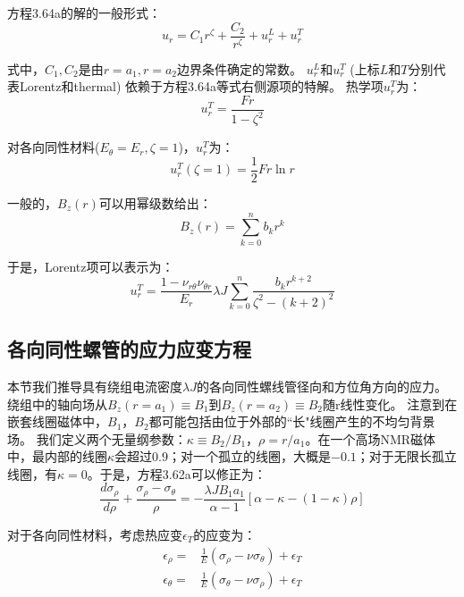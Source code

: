 方程3.64a的解的一般形式：
\begin{equation}
u_r=C_1r^\zeta+\frac{C_2}{r^\zeta}+u_r^L+u_r^T
\end{equation}

式中，$C_1,C_2$是由$r = a_1, r = a_2$边界条件确定的常数。
$u^L_r$和$u^T_r$ (上标$L$和$T$分别代表Lorentz和thermal) 依赖于方程3.64a等式右侧源项的特解。
热学项$u^T_r$为：
\begin{equation}
u_r^T=\frac{Fr}{1-\zeta^2}
\end{equation}

对各向同性材料($E_\theta =E_r,\zeta =1$)，$u_r^T$为：
\begin{equation}
u_r^T(\zeta=1)=\frac{1}{2}Fr \ln r
\end{equation}

一般的，$B_z(r)$可以用幂级数给出：
\begin{equation}
B_z(r)=\sum_{k=0}^{n}b_kr^k
\end{equation}

于是，Lorentz项可以表示为：
\begin{equation}
u_r^T=\frac{1-\nu_{r\theta}\nu_{\theta r}}{E_r}\lambda J\sum_{k=0}^{n}\frac{b_k r^{k+2}}{\zeta^2-(k+2)^2}
\end{equation}

\subsection{各向同性螺管的应力应变方程}
本节我们推导具有绕组电流密度$\lambda J$的各向同性螺线管径向和方位角方向的应力。
绕组中的轴向场从$B_z(r = a_1)\equiv B_1$到$B_z(r = a_2)\equiv B_2$随r线性变化。
注意到在嵌套线圈磁体中，$B_1，B_2$都可能包括由位于外部的``长"线圈产生的不均匀背景场。
我们定义两个无量纲参数：$\kappa\equiv B_2/B_1，\rho = r/a_1$。在一个高场NMR磁体中，最内部的线圈$\kappa$会超过$0.9$；对一个孤立的线圈，大概是$-0.1$；对于无限长孤立线圈，有$\kappa=0$。于是，方程3.62a可以修正为：
\begin{equation}
\frac{d\sigma_{\rho}}{d\rho}+\frac{\sigma_\rho-\sigma_\theta}{\rho}=-\frac{\lambda JB_1a_1}{\alpha-1}[\alpha-\kappa-(1-\kappa)\rho]
\end{equation}

对于各向同性材料，考虑热应变$\epsilon_T$的应变为：
\begin{subequations}
	\begin{align}
\epsilon_\rho=&\frac{1}{E}(\sigma_\rho-\nu\sigma_\theta)+\epsilon_T\\
\epsilon_\theta=&\frac{1}{E}(\sigma_\theta-\nu\sigma_\rho)+\epsilon_T
	\end{align}
\end{subequations}


